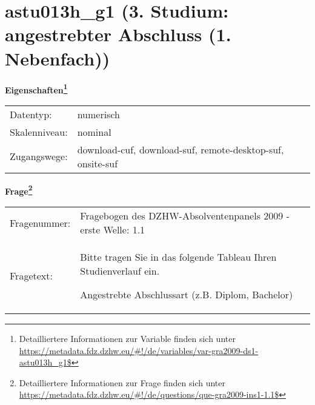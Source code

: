 
    \setcounter{footnote}{0}

    \vspace*{-1.8cm}
	\section{astu013h\_g1 (3. Studium: angestrebter Abschluss (1. Nebenfach))}
	\label{section:astu013h_g1}



    \vspace*{0.5cm}
    \noindent\textbf{Eigenschaften\footnote{Detailliertere Informationen zur Variable finden sich unter
		\url{https://metadata.fdz.dzhw.eu/\#!/de/variables/var-gra2009-ds1-astu013h_g1$}}}\\
	\begin{tabularx}{\hsize}{@{}lX}
	Datentyp: & numerisch \\
	Skalenniveau: & nominal \\
	Zugangswege: &
	  download-cuf, 
	  download-suf, 
	  remote-desktop-suf, 
	  onsite-suf
 \\
    \end{tabularx}



				\vspace*{0.5cm}
                \noindent\textbf{Frage\footnote{Detailliertere Informationen zur Frage finden sich unter
		              \url{https://metadata.fdz.dzhw.eu/\#!/de/questions/que-gra2009-ins1-1.1$}}}\\
				\begin{tabularx}{\hsize}{@{}lX}
					Fragenummer: &
					  Fragebogen des DZHW-Absolventenpanels 2009 - erste Welle:
					  1.1
 \\
					Fragetext: & Bitte tragen Sie in das folgende Tableau Ihren Studienverlauf ein.\par  Angestrebte Abschlussart (z.B. Diplom, Bachelor) \\
				\end{tabularx}





